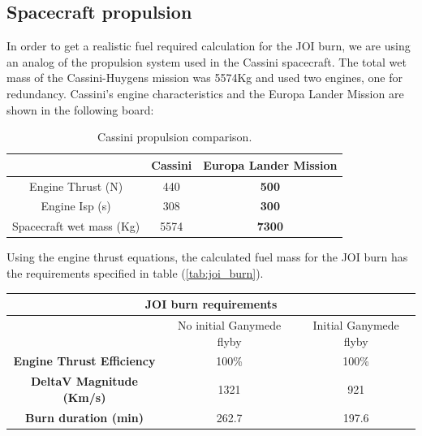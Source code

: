 \subsection*{Spacecraft propulsion}
In order to get a realistic fuel required calculation for the JOI burn, we are using an analog of the propulsion system used in the Cassini spacecraft. The total wet mass of the Cassini-Huygens mission was 5574Kg and used two engines, one for redundancy.
Cassini's engine characteristics and the Europa Lander Mission are shown in the following board:
\begin{table}[h!]
  \centering
    \begin{tabular}{|c|c|c|}
    \hline
          & \textbf{Cassini} & \textbf{Europa Lander Mission} \bigstrut\\
    \hline
    Engine Thrust (N) & 440   & \textbf{500} \bigstrut\\
    \hline
    Engine Isp (s) & 308   & \textbf{300} \bigstrut\\
    \hline
    Spacecraft wet mass (Kg) & 5574  & \textbf{7300} \bigstrut\\
    \hline
    \end{tabular}%
    \caption{Cassini propulsion comparison.}
  \label{tab:propulsion}%
\end{table}%
Using the engine thrust equations, the calculated fuel mass for the JOI burn has the requirements specified in table (\ref{tab:joi_burn}).
\begin{table}[h!]
  \centering
    \begin{tabular}{|c|c|c|}
    \multicolumn{3}{c}{\textbf{JOI burn requirements }} \bigstrut[b]\\
    \hline
    \textbf{} & No initial Ganymede flyby & Initial Ganymede flyby \bigstrut\\
    \hline
    \textbf{Engine Thrust Efficiency} & 100\% & 100\% \bigstrut\\
    \hline
    \textbf{DeltaV Magnitude (Km/s)} & 1321  & 921 \bigstrut\\
    \hline
    \textbf{Burn duration (min)} & 262.7 & 197.6 \bigstrut\\
    \hline
    \end{tabular}%
  \label{tab:joi_burn_req}%
\end{table}%
